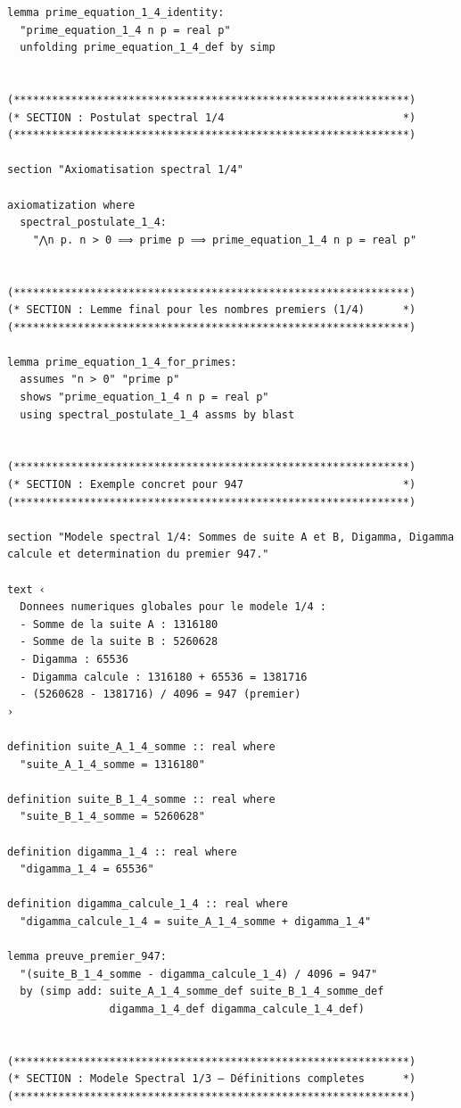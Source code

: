 \documentclass[a4paper,11pt]{article}
\begin{document}
\begin{holcode}[title={\textcolor{white}{Fichier : methode\_spectral.thy -- Partie 1/4}}]
\begin{lstlisting}
lemma prime_equation_1_4_identity:
  "prime_equation_1_4 n p = real p"
  unfolding prime_equation_1_4_def by simp


(**************************************************************)
(* SECTION : Postulat spectral 1/4                            *)
(**************************************************************)

section "Axiomatisation spectral 1/4"

axiomatization where
  spectral_postulate_1_4:
    "⋀n p. n > 0 ⟹ prime p ⟹ prime_equation_1_4 n p = real p"


(**************************************************************)
(* SECTION : Lemme final pour les nombres premiers (1/4)      *)
(**************************************************************)

lemma prime_equation_1_4_for_primes:
  assumes "n > 0" "prime p"
  shows "prime_equation_1_4 n p = real p"
  using spectral_postulate_1_4 assms by blast


(**************************************************************)
(* SECTION : Exemple concret pour 947                         *)
(**************************************************************)

section "Modele spectral 1/4: Sommes de suite A et B, Digamma, Digamma calcule et determination du premier 947."

text ‹
  Donnees numeriques globales pour le modele 1/4 :
  - Somme de la suite A : 1316180
  - Somme de la suite B : 5260628
  - Digamma : 65536
  - Digamma calcule : 1316180 + 65536 = 1381716
  - (5260628 - 1381716) / 4096 = 947 (premier)
›

definition suite_A_1_4_somme :: real where
  "suite_A_1_4_somme = 1316180"

definition suite_B_1_4_somme :: real where
  "suite_B_1_4_somme = 5260628"

definition digamma_1_4 :: real where
  "digamma_1_4 = 65536"

definition digamma_calcule_1_4 :: real where
  "digamma_calcule_1_4 = suite_A_1_4_somme + digamma_1_4"

lemma preuve_premier_947:
  "(suite_B_1_4_somme - digamma_calcule_1_4) / 4096 = 947"
  by (simp add: suite_A_1_4_somme_def suite_B_1_4_somme_def
                digamma_1_4_def digamma_calcule_1_4_def)


(**************************************************************)
(* SECTION : Modele Spectral 1/3 – Définitions completes      *)
(**************************************************************)


\end{lstlisting}
\end{holcode}
\end{document}
